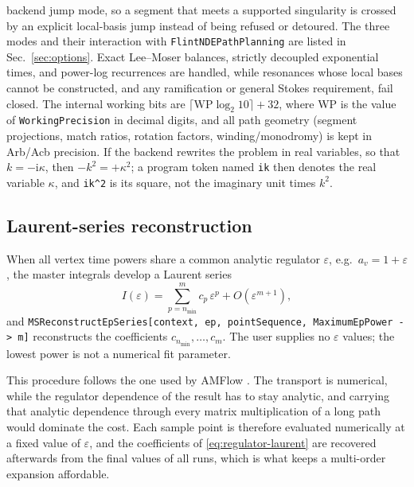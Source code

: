 \documentclass[11pt,a4paper]{article}
\newcommand{\ii}{\mathrm i}
\begin{document}
backend jump mode, so a segment that meets a supported singularity is crossed by an explicit
local-basis jump instead of being refused or detoured. The three modes and their interaction with
\texttt{FlintNDEPathPlanning} are listed in Sec.~\ref{sec:options}. Exact Lee--Moser balances,
strictly decoupled exponential times, and power-log recurrences are handled, while resonances
whose local bases cannot be constructed, and any ramification or general Stokes requirement, fail
closed. The internal working bits are $\lceil\mathrm{WP}\log_2 10\rceil+32$, where WP is the value of
\texttt{WorkingPrecision} in decimal digits, and all path geometry (segment
projections, match ratios, rotation factors, winding/monodromy) is kept in Arb/Acb precision.
If the backend rewrites the problem in real variables, so that $k=-\ii\kappa$, then $-k^2=+\kappa^2$;
a program token named \texttt{ik} then denotes the real variable $\kappa$, and \texttt{ik\^{}2} is its
square, not the imaginary unit times $k^2$.

\subsection{Laurent-series reconstruction}
\label{sec:regulator}

When all vertex time powers share a common analytic regulator $\varepsilon$, e.g.\
$a_v=1+\varepsilon$, the master integrals develop a Laurent series
\begin{equation}
  I(\varepsilon)=\sum_{p=n_{\min}}^{m}c_p\,\varepsilon^p
  +O(\varepsilon^{m+1}),
  \label{eq:regulator-laurent}
\end{equation}
and \texttt{MSReconstructEpSeries[context, ep, pointSequence, MaximumEpPower -> m]}
reconstructs the coefficients $c_{n_{\min}},\ldots,c_m$. The user supplies no
$\varepsilon$ values; the lowest power is not a numerical fit parameter.

This procedure follows the one used by AMFlow \cite{Liu:2022chg,Huang:2026rjb}. The transport
is numerical, while the regulator dependence of the result has to stay analytic, and carrying that
analytic dependence through every matrix multiplication of a long path would dominate the cost.
Each sample point is therefore evaluated numerically at a fixed value of $\varepsilon$, and the
coefficients of \eqref{eq:regulator-laurent} are recovered afterwards from the final values of all
runs, which is what keeps a multi-order expansion affordable.
\end{document}
